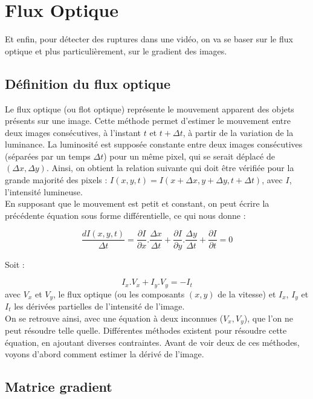 \section{Flux Optique}

Et enfin, pour détecter des ruptures dans une vidéo, on va se baser sur le flux optique et plus particulièrement, sur le gradient des images.

\subsection{Définition du flux optique}

Le flux optique (ou flot optique) représente le mouvement apparent des objets présents sur une image. Cette méthode permet d'estimer le mouvement entre deux images consécutives, à l'instant $t$ et $t + \Delta t$, à partir de la variation de la luminance. La luminosité est supposée constante entre deux images consécutives (séparées par un temps $\Delta t$) pour un même pixel, qui se serait déplacé de $(\Delta x, \Delta y)$. Ainsi, on obtient la relation suivante qui doit être vérifiée pour la grande majorité des pixels : $I(x, y, t) = I(x + \Delta x, y + \Delta y, t + \Delta t)$, avec $I$, l'intensité lumineuse.\\

En supposant que le mouvement est petit et constant, on peut écrire la précédente équation sous forme différentielle, ce qui nous donne : 

\[
	\frac{dI(x, y, t)}{\Delta t} = \frac{\partial I}{\partial x}.\frac{\Delta x}{\Delta t} + \frac{\partial I}{\partial y}.\frac{\Delta y}{\Delta t} + \frac{\partial I}{\partial t} = 0
\]

Soit :

\[
	I_x.V_x + I_y.V_y = -I_t
\]
avec $V_x$ et $V_y$, le flux optique (ou les composants $(x, y)$ de la vitesse) et $I_x$, $I_y$ et $I_t$ les dérivées partielles de l'intensité de l'image.\\

On se retrouve ainsi, avec une équation à deux inconnues ($V_x, V_y$), que l'on ne peut résoudre telle quelle. Différentes méthodes existent pour résoudre cette équation, en ajoutant diverses contraintes. Avant de voir deux de ces méthodes, voyons d'abord comment estimer la dérivé de l'image.

\subsection{Matrice gradient}

